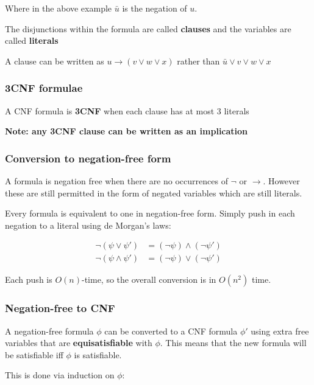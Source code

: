 \documentclass{article}
\begin{document}
Where in the above example $\bar{u}$ is the negation of $u$.

The disjunctions within the formula are called \textbf{clauses } and the variables are called \textbf{literals}

A clause can be written as $u \rightarrow (v \vee w \vee x)$ rather than $\bar{u} \vee v \vee w \vee x$

\subsubsection{3CNF formulae}
\label{subsubsec:3cnf}

A CNF formula is \textbf{3CNF} when each clause has at most 3 literals

\textbf{Note: any 3CNF clause can be written as an implication}

\subsubsection{Conversion to negation-free form}
\label{subsec:negneg}

A formula is negation free when there are no occurrences of $\neg$ or $\rightarrow $. However these are still permitted in the form of negated variables which are still literals.

Every formula is equivalent to one in negation-free form. Simply push in each negation to a literal using de Morgan's laws:

\begin{align*}
  \neg(\psi \vee \psi ') &= (\neg \psi) \wedge (\neg \psi ') \\
  \neg(\psi \wedge \psi ') &= (\neg \psi) \vee (\neg \psi ')
\end{align*}

Each push is $O(n)$-time, so the overall conversion is in $O(n^{2})$ time.

\subsubsection{Negation-free to CNF}
\label{subsec:neg-free-CNF}

A negation-free formula $\phi$ can be converted to a CNF formula $\phi '$ using extra free variables that are \textbf{equisatisfiable} with $\phi$. This means that the new formula will be satisfiable iff $\phi$ is satisfiable.

This is done via induction on $\phi$:
\end{document}
